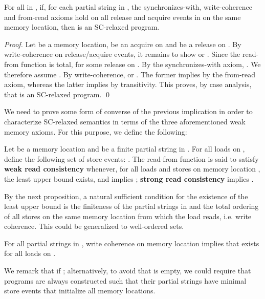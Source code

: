 \documentclass{llncs}
\newcommand{\defn}[1]{\textbf{#1}}
\begin{document}
\begin{proposition}
\label{proposition:SC-relaxed-consistency}
For all  in , if, for each partial string  in , the synchronizes-with, write-coherence and from-read axioms hold on all release and acquire events in  on the same memory location, then  is an SC-relaxed program.
\end{proposition}
\begin{proof}
Let  be a memory location,  be an acquire on  and  be a release on . By write-coherence on release/acquire events, it remains to show  or . Since the read-from function is total,  for some release  on . By the synchronizes-with axiom, . We therefore assume . By write-coherence,  or . The former implies  by the from-read axiom, whereas the latter implies  by transitivity. This proves, by case analysis, that  is an SC-relaxed program. \qed
\end{proof}

We need to prove some form of converse of the previous implication in order to characterize SC-relaxed semantics in terms of the three aforementioned weak memory axioms. For this purpose, we define the following:

\begin{definition}
\label{def:read-consistency}
Let  be a memory location and  be a finite partial string in . For all loads  on , define the following set of store events: . The read-from function  is said to satisfy \defn{weak read consistency} whenever, for all loads  and stores  on memory location , the least upper bound  exists, and  implies ; \defn{strong read consistency} implies .
\end{definition}

By the next proposition, a natural sufficient condition for the existence of the least upper bound  is the finiteness of the partial strings in  and the total ordering of all stores on the same memory location from which the load  reads, i.e. write coherence. This could be generalized to well-ordered sets.

\begin{proposition}
\label{proposition:weak-read-consistency-existence}
For all partial strings  in , write coherence on memory location  implies that  exists for all loads  on .
\end{proposition}

We remark that  if ; alternatively, to avoid that  is empty, we could require that programs are always constructed such that their partial strings have minimal store events that initialize all memory locations.
\end{document}
